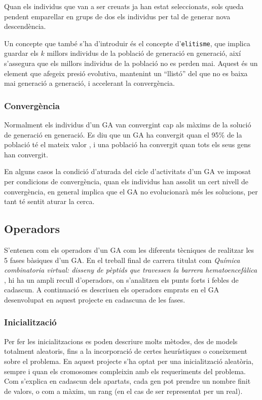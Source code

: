 \documentclass[titlepage,a4paper,12pt]{book}
\begin{document}
Quan els individus que van a ser creuats ja han estat seleccionats, sols queda
pendent emparellar en grups de dos els individus per tal de generar nova
descendència. 

Un concepte que també s'ha d'introduir és el concepte d'\texttt{elitisme}, que
implica guardar els $k$ millors individus de la població de generació en
generació, així s'assegura que els millors individus de la població no es perden
mai.  Aquest és un element que afegeix presió evolutiva, mantenint un ``llistó''
del que no es baixa mai generació a generació, i accelerant la convergència.

\subsubsection{Convergència} 

Normalment els individus d'un GA van convergint cap als màxims de la solució de
generació en generació. Es diu que un GA ha convergit quan el 95\% de la
població té el mateix valor \cite{D75}, i una població ha convergit quan tots
els seus gens han convergit.

En alguns casos la condició d'aturada del cicle d'activitats d'un GA ve imposat
per condicions de convergència, quan els individus han assolit un cert nivell de
convergència, en general implica que el GA no evolucionarà més les solucions,
per tant té sentit aturar la cerca.

\subsection{Operadors\label{subsec:operadors}} 

S'entenen com els operadors d'un GA com les diferents tècniques de realitzar les
5 fases bàsiques d'un GA. En el treball final de carrera titulat com
\emph{Química combinatoria virtual: disseny de pèptids que travessen la barrera
hematoencefàlica} \cite{B01},  hi ha un ampli recull d'operadors, on s'analitzen
els punts forts i febles de cadascun.  A continuació es descriuen els operadors
emprats en el GA desenvolupat en aquest projecte en cadascuna de les fases.

\subsubsection{Inicialització} 

Per fer les inicialitzacions es poden descriure molts mètodes, des de models
totalment aleatoris, fins a la incorporació de certes heurístiques o coneixement
sobre el problema. En aquest projecte s'ha optat per una inicialització
aleatòria, sempre i quan els cromosomes compleixin amb els requeriments del
problema.  Com s'explica en cadascun dels apartats, cada gen pot prendre un
nombre finit de valors, o com a màxim, un rang (en el cas de ser representat per
un real).
\end{document}
